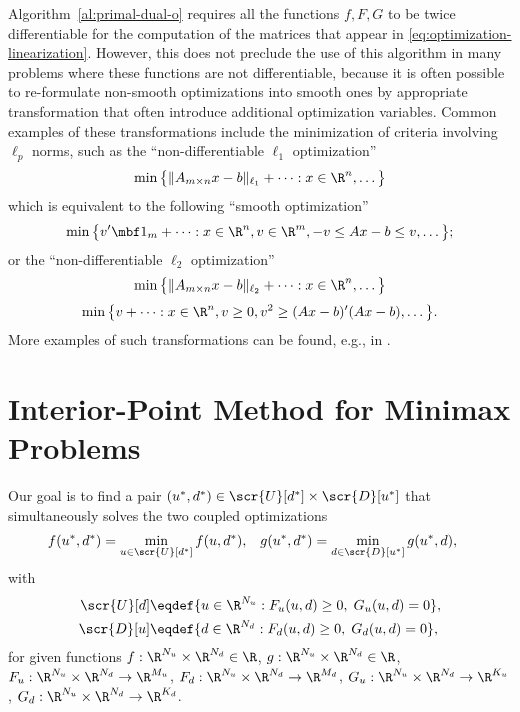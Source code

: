 \documentclass[11pt]{article}
\begin{document}
\begin{remark}[Smoothness]
  Algorithm~\ref{al:primal-dual-o} requires all the functions $f,F,G$ to
  be twice differentiable for the computation of the matrices that
  appear in \eqref{eq:optimization-linearization}. However, this does
  not preclude the use of this algorithm in many problems where these
  functions are not differentiable, because it is often possible to
  re-formulate non-smooth optimizations into smooth ones by
  appropriate transformation that often introduce additional
  optimization variables. Common examples of these transformations
  include the minimization of criteria involving $\ell_p$ norms, such as
  the ``non-differentiable $\ell_1$ optimization''
  \begin{align*}
    \min \big\{ \|A_{m\times n}x-b\|_{\ell_1}+\cdots: x\in\R^n,\dots \big\}
  \end{align*}
  which is equivalent to the following ``smooth optimization''
  \begin{align*}
    \min \big\{v'\mbf 1_m +\cdots:x\in\R^n,v\in\R^m, -v\le Ax-b\le v,\dots\big\};
  \end{align*}
  or the ``non-differentiable $\ell_2$ optimization''
  \begin{align*}
    \min \big\{\|A_{m\times n}x-b\|_{\ell_2}+\cdots: x\in\R^n,\dots\big\}
  \end{align*}
  \begin{align*}
    \min \big\{v +\cdots:x\in\R^n,v\ge0, v^2\ge (Ax-b)'(Ax-b),\dots \big\}.
  \end{align*}
  More examples of such transformations can be found, e.g., in
  \cite{GrantBoyd2008}. \frqed
\end{remark}

\section{Interior-Point Method for Minimax Problems}
\label{sec:ipm}

Our goal is to find a pair
$(u^*,d^*)\in\scr{U}[d^*]\times\scr{D}[u^*]$ that simultaneously
solves the two coupled optimizations
\begin{align}\label{eq:equilibria}
  f(u^*,d^*)&=\min_{u\in\scr{U}[d^*]} f(u,d^*), &
  g(u^*,d^*)&=\min_{d\in\scr{D}[u^*]} g(u^*,d),
\end{align}
with
\begin{align*}
    \scr{U}[d]&\eqdef\{u\in\R^{N_u}: F_u(u,d)\ge 0,\; G_u(u,d)=0\}, \\
    \scr{D}[u]&\eqdef\{d\in\R^{N_d}: F_d(u,d)\ge 0,\; G_d(u,d)=0\},
\end{align*}
for given functions $f:\R^{N_u}\times\R^{N_d}\in\R$, $g:\R^{N_u}\times\R^{N_d}\in\R$,
$F_u:\R^{N_u}\times\R^{N_d}\to\R^{M_u}$, $F_d:\R^{N_u}\times\R^{N_d}\to\R^{M_d}$,
$G_u:\R^{N_u}\times\R^{N_d}\to\R^{K_u}$, $G_d:\R^{N_u}\times\R^{N_d}\to\R^{K_d}$.
\end{document}
